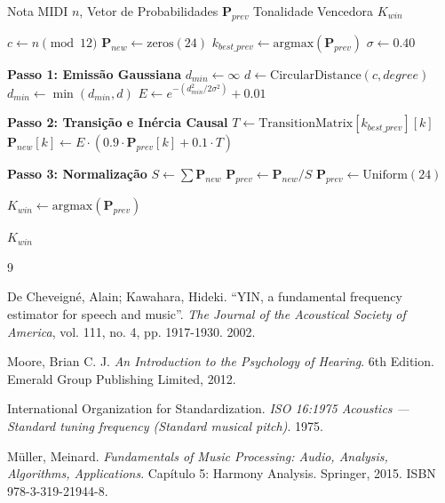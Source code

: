 \documentclass[11pt, a4paper]{article}
\theoremstyle{plain}
\theoremstyle{definition}
\begin{document}
\begin{algorithm}[H]
\caption{Detecção de Tonalidade Causal (HMM Gaussiano Fuzzy)}
\label{alg:key_detection}
\begin{algorithmic}[1]
\Require Nota MIDI $n$, Vetor de Probabilidades $\mathbf{P}_{prev}$
\Ensure Tonalidade Vencedora $K_{win}$

\State $c \gets n \pmod{12}$ 
\State $\mathbf{P}_{new} \gets \text{zeros}(24)$
\State $k_{best\_prev} \gets \text{argmax}(\mathbf{P}_{prev})$
\State $\sigma \gets 0.40$ 

    \State \textbf{Passo 1: Emissão Gaussiana}
    \State $d_{min} \gets \infty$
        \State $d \gets \text{CircularDistance}(c, degree)$
        \State $d_{min} \gets \min(d_{min}, d)$
    \EndFor
    \State $E \gets e^{-(d_{min}^2 / 2\sigma^2)} + 0.01$

    \State \textbf{Passo 2: Transição e Inércia Causal}
    \State $T \gets \text{TransitionMatrix}[k_{best\_prev}][k]$
    \State $\mathbf{P}_{new}[k] \gets E \cdot (0.9 \cdot \mathbf{P}_{prev}[k] + 0.1 \cdot T)$
\EndFor

\State \textbf{Passo 3: Normalização}
\State $S \gets \sum \mathbf{P}_{new}$
    \State $\mathbf{P}_{prev} \gets \mathbf{P}_{new} / S$ 
\Else
    \State $\mathbf{P}_{prev} \gets \text{Uniform}(24)$ 
\EndIf

\State $K_{win} \gets \text{argmax}(\mathbf{P}_{prev})$

\State \Return $K_{win}$
\end{algorithmic}
\end{algorithm}

\begin{thebibliography}{9}

De Cheveigné, Alain; Kawahara, Hideki.
``YIN, a fundamental frequency estimator for speech and music''.
\textit{The Journal of the Acoustical Society of America}, vol. 111, no. 4, pp. 1917-1930.
2002.

Moore, Brian C. J.
\textit{An Introduction to the Psychology of Hearing}.
6th Edition. Emerald Group Publishing Limited, 2012.

International Organization for Standardization.
\textit{ISO 16:1975 Acoustics — Standard tuning frequency (Standard musical pitch)}.
1975.

Müller, Meinard.
\textit{Fundamentals of Music Processing: Audio, Analysis, Algorithms, Applications}.
Capítulo 5: Harmony Analysis.
Springer, 2015.
ISBN 978-3-319-21944-8.

\end{thebibliography}
\end{document}
